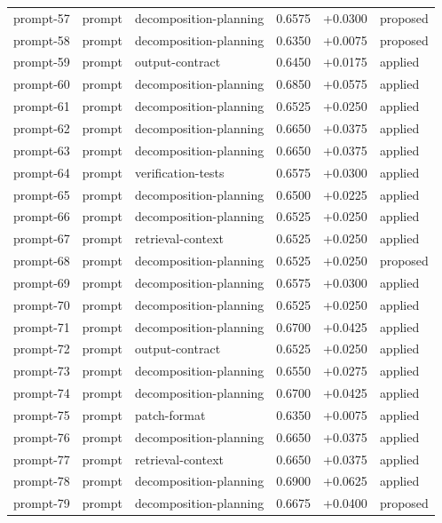 \begin{center}
\begin{longtable}{llp{5.2cm}rrl}
prompt-57 & prompt & decomposition-planning & 0.6575 & +0.0300 & proposed \\
prompt-58 & prompt & decomposition-planning & 0.6350 & +0.0075 & proposed \\
prompt-59 & prompt & output-contract & 0.6450 & +0.0175 & applied \\
prompt-60 & prompt & decomposition-planning & 0.6850 & +0.0575 & applied \\
prompt-61 & prompt & decomposition-planning & 0.6525 & +0.0250 & applied \\
prompt-62 & prompt & decomposition-planning & 0.6650 & +0.0375 & applied \\
prompt-63 & prompt & decomposition-planning & 0.6650 & +0.0375 & applied \\
prompt-64 & prompt & verification-tests & 0.6575 & +0.0300 & applied \\
prompt-65 & prompt & decomposition-planning & 0.6500 & +0.0225 & applied \\
prompt-66 & prompt & decomposition-planning & 0.6525 & +0.0250 & applied \\
prompt-67 & prompt & retrieval-context & 0.6525 & +0.0250 & applied \\
prompt-68 & prompt & decomposition-planning & 0.6525 & +0.0250 & proposed \\
prompt-69 & prompt & decomposition-planning & 0.6575 & +0.0300 & applied \\
prompt-70 & prompt & decomposition-planning & 0.6525 & +0.0250 & applied \\
prompt-71 & prompt & decomposition-planning & 0.6700 & +0.0425 & applied \\
prompt-72 & prompt & output-contract & 0.6525 & +0.0250 & applied \\
prompt-73 & prompt & decomposition-planning & 0.6550 & +0.0275 & applied \\
prompt-74 & prompt & decomposition-planning & 0.6700 & +0.0425 & applied \\
prompt-75 & prompt & patch-format & 0.6350 & +0.0075 & applied \\
prompt-76 & prompt & decomposition-planning & 0.6650 & +0.0375 & applied \\
prompt-77 & prompt & retrieval-context & 0.6650 & +0.0375 & applied \\
prompt-78 & prompt & decomposition-planning & 0.6900 & +0.0625 & applied \\
prompt-79 & prompt & decomposition-planning & 0.6675 & +0.0400 & proposed \\

\end{longtable}
\end{center}

